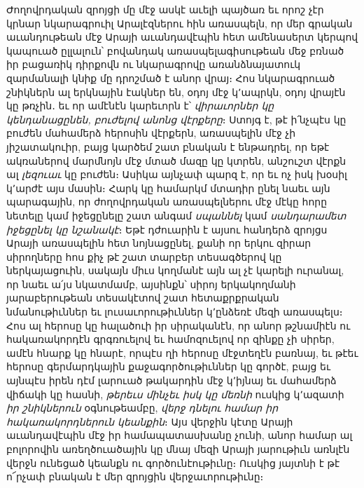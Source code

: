 \documentclass{article}
\begin{document}
{Ժողովրդական զրոյցի մը մէջ ասկէ աւելի պայծառ եւ որոշ չէր կրնար նկարագրուիլ Արալէզներու հին առասպելն, որ մեր գրական աւանդութեան մէջ Արայի աւանդավէպին հետ ամենասերտ կերպով կապուած ըլլալուն՝ բովանդակ առասպելագիսութեան մեջ բռնած իր բացառիկ դիրքովն ու նկարագրովը առանձնայատուկ զարմանալի կնիք մը դրոշմած է անոր վրայ։ Հոս նկարագրուած շնիկներն ալ երկնային էակներ են, օդոյ մէջ կ՚ապրկն, օդոյ վրայէն կը թռչին․ եւ որ ամէնէն կարեւորն է՝ \emph{վիրաւորներ կը կենդանացընեն, բուժելով անոնց վէրքերը}։ Ստոյգ է, թէ ի՛նչպէս կը բուժեն մահամերձ հերոսին վէրքերն, առասպելին մէջ չի յիշատակուիր, բայց կարծեմ շատ բնական է ենթադրել, որ եթէ ակռաներով մարմնոյն մէջ մտած մազը կը կտրեն, անշուշտ վէրքն ալ \emph{լեզուաւ} կը բուժեն։ Ասիկա այնչափ պարզ է, որ եւ ոչ իսկ խօսիլ կ՚արժէ այս մասին։ Հարկ կը համարկմ մտադիր ընել նաեւ այն պարագային, որ ժողովրդական առասպելներու մէջ մէկը հորը նետելը կամ իջեցընելը շատ անգամ \emph{սպաննել} կամ \emph{սանդարամետ իջեցընել կը նշանակէ}։ Եթէ դժուարին է այսու հանդերձ զրոյցս Արայի առասպելին հետ նոյնացընել, քանի որ երկու զիրար սիրողները հոս քիչ թէ շատ տարբեր տեսագծերով կը ներկայացուին, սակայն միւս կողմանէ այն ալ չէ կարելի ուրանալ, որ նաեւ ա՛յս նկատմամբ, այսինքն՝ սիրոյ երկակողմանի յարաբերութեան տեսակէտով շատ հետաքրքրական նմանութիւններ եւ լուսաւորութիւններ կ՚ընձեռէ մեզի առասպելս։ Հոս ալ հերոսը կը հալածուի իր սիրականէն, որ անոր թշնամիէն ու հակառակորդէն գրգռուելով եւ համոզուելով որ զինքը չի սիրեր, ամէն հնարք կը հնարէ, որպէս ղի հերոսը մէջտեղէն բառնայ, եւ թէեւ հերոսը գերմարդկային քաջագործութիւններ կը գործէ, բայց եւ այնպէս իրեն դէմ լարուած թակարդին մէջ կ՚իյնայ եւ մահամերձ վիճակի կը հասնի, \emph{թերեւս մինչեւ իսկ կը մեռնի} ուսկից կ՚ազատի \emph{իր շնիկներուն} օգնութեամբը, \emph{վերջ դնելու համար իր հակառակորդներուն կեանքին}։ Այս վերջին կէտը Արայի աւանդավէպին մէջ իր համապատասխանը չունի, անոր համար ալ բոլորովին առեղծուածային կը մնայ մեզի Արայի յարութիւն առնլէն վերջն ունեցած կեանքն ու գործունէութիւնը։ Ուսկից յայտնի է թէ ո՜րչափ բնական է մեր զրոյցին վերջաւորութիւնը։

}
\end{document}
